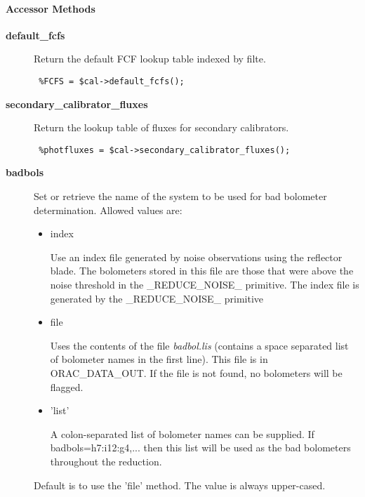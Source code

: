 \paragraph*{Accessor Methods\label{ORAC::Calib::SCUBA_Accessor_Methods}}
\begin{description}

\item[{\textbf{default\_fcfs}}] \mbox{}

Return the default FCF lookup table indexed by filte.

\begin{verbatim}
 %FCFS = $cal->default_fcfs();
\end{verbatim}

\item[{\textbf{secondary\_calibrator\_fluxes}}] \mbox{}

Return the lookup table of fluxes for secondary calibrators.

\begin{verbatim}
 %photfluxes = $cal->secondary_calibrator_fluxes();
\end{verbatim}

\item[{\textbf{badbols}}] \mbox{}

Set or retrieve the name of the system to be used for bad bolometer
determination. Allowed values are:

\begin{itemize}

\item index

Use an index file generated by noise observations
using the reflector blade. The bolometers stored in this
file are those that were above the noise threshold in 
the \_REDUCE\_NOISE\_ primitive. The index file is generated
by the \_REDUCE\_NOISE\_ primitive


\item file

Uses the contents of the file \emph{badbol.lis} (contains a space
separated list of bolometer names in the first line). This
file is in ORAC\_DATA\_OUT. If the file is not found, no
bolometers will be flagged.


\item 'list'

A colon-separated list of bolometer names can be supplied.
If badbols=h7:i12:g4,... then this list will be used
as the bad bolometers throughout the reduction.

\end{itemize}


Default is to use the 'file' method.
The value is always upper-cased.

\end{description}
